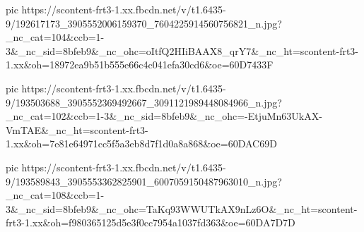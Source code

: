   pic https://scontent-frt3-1.xx.fbcdn.net/v/t1.6435-9/192617173_3905552006159370_7604225914560756821_n.jpg?_nc_cat=104&ccb=1-3&_nc_sid=8bfeb9&_nc_ohc=oItfQ2HIiBAAX8_qrY7&_nc_ht=scontent-frt3-1.xx&oh=18972ea9b51b555e66c4c041efa30cd6&oe=60D7433F

  pic https://scontent-frt3-1.xx.fbcdn.net/v/t1.6435-9/193503688_3905552369492667_3091121989448084966_n.jpg?_nc_cat=102&ccb=1-3&_nc_sid=8bfeb9&_nc_ohc=-EtjuMn63UkAX-VmTAE&_nc_ht=scontent-frt3-1.xx&oh=7e81e64971cc5f5a3eb8d7f1d0a8a868&oe=60DAC69D

  pic https://scontent-frt3-1.xx.fbcdn.net/v/t1.6435-9/193589843_3905553362825901_6007059150487963010_n.jpg?_nc_cat=108&ccb=1-3&_nc_sid=8bfeb9&_nc_ohc=TaKq93WWUTkAX9nLz6O&_nc_ht=scontent-frt3-1.xx&oh=f980365125d5e3f0cc7954a1037fd363&oe=60DA7D7D
\fi

